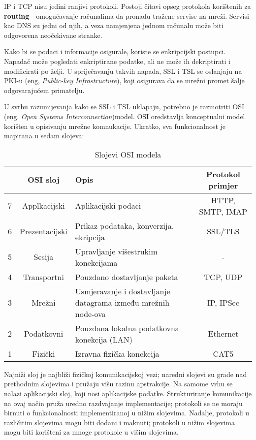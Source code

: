 \documentclass[times, utf8, diplomski]{fer}
\begin{document}
\medskip

IP i TCP nisu jedini ranjivi protokoli. Postoji čitavi opseg protokola korištenih za \textbf{routing} - omogućavanje računalima da pronađu tražene servise na mreži. Servisi kao DNS su jedni od njih, a veza namjenjena jednom računalu može biti odgovorena neočekivane stranke.

\medskip 

Kako bi se podaci i informacije osigurale, koriste se enkripcijski postupci. Napadač može pogledati enkriptirane podatke, ali ne može ih dekriptirati i modificirati po želji. U spriječavanju takvih napada, SSL i TSL se oslanjaju na PKI-u (eng, \textit{Public-key Infrastructure}), koji osigurava da se mrežni promet šalje odgovarajućem primatelju.

U svrhu razumijevanja kako se SSL i TSL uklapaju, potrebno je razmotriti OSI (eng. \textit{Open Systems Interconnection})model. OSI oredstavlja konceptualni model korišten u opisivanju mrežne komnukacije. Ukratko, sva funkcionalnost je mapirana u sedam slojeva:

\begin{table}[!ht]
\caption{Slojevi OSI modela}
\begin{tabularx}{\textwidth} {c c X c}
\hline
&\textbf{OSI sloj} & \textbf{Opis} & \textbf{Protokol primjer}\\
\hline 
7 & Applkacijski & Aplikacijski podaci & HTTP, SMTP, IMAP \\
6 & Prezentacijski & Prikaz podataka, konverzija, ekripcija & SSL/TLS \\
5 & Sesija & Upravljanje višestrukim konekcijama & - \\
4 & Transportni & Pouzdano dostavljanje paketa & TCP, UDP \\
3 & Mrežni & Usmjeravanje i dostavljanje datagrama između mrežnih node-ova & IP, IPSec\\
2 & Podatkovni & Pouzdana lokalna podatkovna konekcija (LAN) & Ethernet \\
1 & Fizički & Izravna fizička konekcija & CAT5\\
\hline
\end{tabularx}
\end{table}

Najniži sloj je najbliži fizičkoj komunikacijskoj vezi; naredni slojevi su grade nad prethodnim slojevima i pružaju višu razinu apstrakcije. Na samome vrhu se nalazi aplikacijski sloj, koji nosi aplikacijske podatke. Strukturiranje komunikacije na ovaj način pruža uredno razdvajanje implementacije; protokoli se ne moraju birnuti o funkcionalnosti implementiranoj u nižim slojevima. Nadalje, protokoli u različitim slojevima mogu biti dodani i maknuti; protokoli u nižim slojevima mogu biti korišteni za mnoge protokole u višim slojevima.
\end{document}
